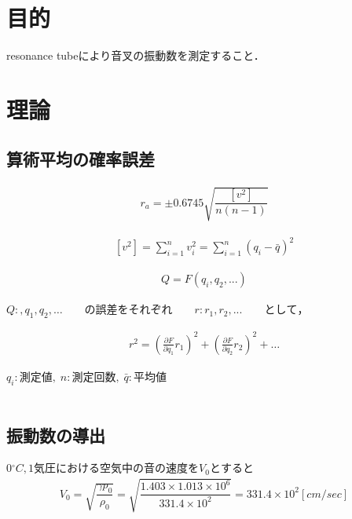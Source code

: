 \documentclass[a4paper,1pt]{jsarticle}
\begin{document}
\section{目的}
resonance tubeにより音叉の振動数を測定すること．\\




\section{理論}

 \subsection*{算術平均の確率誤差}

 \begin{eqnarray}
  \label{kakuritugosa}
  r_a=\pm0.6745\sqrt{\dfrac{[v^2]}{n(n-1)}}
\end{eqnarray}

\begin{eqnarray}
  \label{kaisekizansa}
  [v^2]=\sum_{i=1}^n v_i^2=\sum_{i=1}^n(q_i-\bar{q})^2
\end{eqnarray}

\begin{eqnarray}
  \label{kaisekizansa}
  Q=F(q_i,q_2,...)
\end{eqnarray}


  $Q:,q_1,q_2,\dots\qquad の誤差をそれぞれ\qquad r:r_1,r_2,...\qquad として，$

  \begin{eqnarray}
    \label{kaisekizansa}
    r^2=\left(\frac{\partial F}{\partial q_1}r_1\right)^2+\left(\frac{\partial F}{\partial q_2}r_2\right)^2+\dots
  \end{eqnarray}


  


  $q_i:測定値,\; n:測定回数,\; \bar{q}:平均値$\\\\




\subsection*{振動数の導出}
$0{}^\circ{C},1気圧における空気中の音の速度をV_0とすると$\\

\begin{eqnarray}
  \label{velosity_0}
 V_0=\sqrt{\dfrac{\gamma p_0}{\rho _0}}=\sqrt{\dfrac{1.403\times 1.013\times 10^6}{331.4\times 10^2 }}=331.4\times 10^2[cm/sec]
\end{eqnarray}\\
\end{document}
